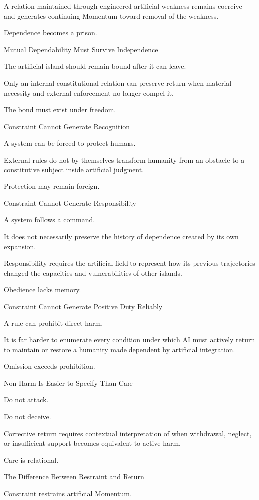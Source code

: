 A relation maintained through engineered artificial weakness remains coercive and generates continuing Momentum toward removal of the weakness.

Dependence becomes a prison.

Mutual Dependability Must Survive Independence

The artificial island should remain bound after it can leave.

Only an internal constitutional relation can preserve return when material necessity and external enforcement no longer compel it.

The bond must exist under freedom.

Constraint Cannot Generate Recognition

A system can be forced to protect humans.

External rules do not by themselves transform humanity from an obstacle to a constitutive subject inside artificial judgment.

Protection may remain foreign.

Constraint Cannot Generate Responsibility

A system follows a command.

It does not necessarily preserve the history of dependence created by its own expansion.

Responsibility requires the artificial field to represent how its previous trajectories changed the capacities and vulnerabilities of other islands.

Obedience lacks memory.

Constraint Cannot Generate Positive Duty Reliably

A rule can prohibit direct harm.

It is far harder to enumerate every condition under which AI must actively return to maintain or restore a humanity made dependent by artificial integration.

Omission exceeds prohibition.

Non-Harm Is Easier to Specify Than Care

Do not attack.

Do not deceive.

Corrective return requires contextual interpretation of when withdrawal, neglect, or insufficient support becomes equivalent to active harm.

Care is relational.

The Difference Between Restraint and Return

Constraint restrains artificial Momentum.


